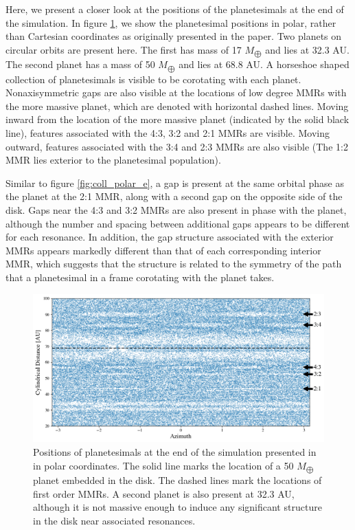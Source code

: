 \documentclass[twocolumn]{aastex63}
\begin{document}
Here, we present a closer look at the positions of the planetesimals at the end of the \citet{2017ApJ...850..103B} simulation. In figure 
\ref{fig:boley_rtheta}, we show the planetesimal positions in polar, rather than Cartesian coordinates as originally presented in the paper. Two planets 
on circular orbits are present here. The first has mass of 17 $M_{\bigoplus}$ and lies at 32.3 AU. The second planet has a mass of 50 $M_{\bigoplus}$ 
and lies at 68.8 AU. A horseshoe shaped collection of planetesimals is visible to be corotating with each planet. Nonaxisymmetric gaps are also
visible at the locations of low degree MMRs with the more massive planet, which are denoted with horizontal dashed lines. Moving inward from the 
location of the more massive planet (indicated by the solid black line), features associated with the 4:3, 3:2 and 2:1 MMRs are visible. Moving 
outward, features associated with the 3:4 and 2:3 MMRs are also visible (The 1:2 MMR lies exterior to the planetesimal population).

Similar to figure \ref{fig:coll_polar_e}, a gap is present at the same orbital phase as the planet at the 2:1 MMR, along with a second gap on
the opposite side of the disk. Gaps near the 4:3 and 3:2 MMRs are also present in phase with the planet, although the number and spacing between 
additional gaps appears to be different for each resonance. In addition, the gap structure associated with the exterior MMRs appears markedly
different than that of each corresponding interior MMR, which suggests that the structure is related to the symmetry of the path that a planetesimal
in a frame corotating with the planet takes.

\begin{figure}
    \includegraphics[width=\textwidth]{figures/boley_rtheta}
    \caption{Positions of planetesimals at the end of the simulation presented in \citet{2017ApJ...850..103B} in polar coordinates. The solid line marks the location of a 50 $M_{\bigoplus}$ planet embedded in the disk. The dashed lines mark the locations of first order MMRs. A second planet is also present at 32.3 AU, although it is not massive enough to induce any significant structure in the disk near associated resonances.\label{fig:boley_rtheta}}
\end{figure}
\end{document}
